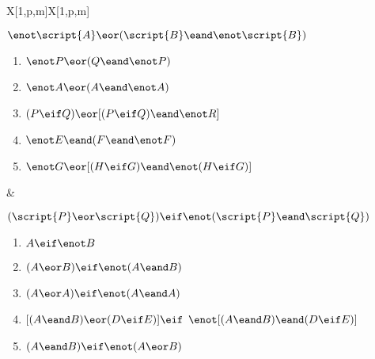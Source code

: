 \begin{exercises}
\begin{longtabu}{X[1,p,m]X[1,p,m]}
\\
\item $\enot \script{A} \eor (\script{B} \eand \enot \script{B})$
	\begin{flushleft}
	\begin{enumerate}[label=\alph*.]
	\item $\enot P \eor (Q \eand \enot P)$
	\item $\enot A \eor (A \eand \enot A)$
	\item $(P \eif Q) \eor [(P \eif Q) \eand \enot R]$
	\item $\enot E \eand (F \eand \enot F)$
	\item $\enot G \eor [(H \eif G) \eand \enot (H \eif G)]$
	\end{enumerate}
	\end{flushleft}

&


\item	$(\script{P} \eor \script{Q}) \eif \enot(\script{P} \eand \script{Q})$
\begin{flushleft} 	
\begin{enumerate}[label=\alph*.]
	\item	$A \eif \enot B$
	\item	$(A \eor B) \eif \enot(A \eand B)$
	\item	$(A \eor A) \eif \enot(A \eand A)$
	\item	$[(A \eand B) \eor (D \eif E)] \eif $ \linebreak[4]$ \enot[(A \eand B) \eand (D \eif E)]$
	\item	$(A \eand B) \eif \enot(A \eor B)$
	\end{enumerate}
\end{flushleft} 


\end{longtabu}
\end{exercises}

